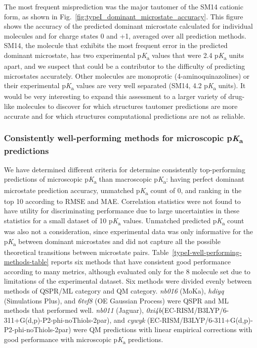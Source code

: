\documentclass[9pt,lineno,final]{elife}
\newcommand{\pKa}{p\textit{K}\textsubscript{a}}
\begin{document}
The most frequent misprediction was the major tautomer of the SM14 cationic form, as shown in Fig.~\ref{fig:typeI_dominant_microstate_accuracy}. 
This figure shows the accuracy of the predicted dominant microstate calculated for individual molecules and for charge states 0 and +1, averaged over all prediction methods. 
SM14, the molecule that exhibits the most frequent error in the predicted dominant microstate, has two experimental \pKa{} values that were 2.4 \pKa{} units apart, and we suspect that could be a contributor to the difficulty of predicting microstates accurately. 
Other molecules are monoprotic (4-aminoquinazolines) or their experimental \pKa{} values are very well separated (SM14, 4.2 \pKa{} units). 
It would be very interesting to expand this assessment to a larger variety of drug-like molecules to discover for which structures tautomer predictions are more accurate and for which structures computational predictions are not as reliable.


\subsubsection{Consistently well-performing methods for microscopic \pKa{} predictions}

We have determined different criteria for determine consistently top-performing predictions of microscopic \pKa{} than macroscopic \pKa{}: having perfect dominant microstate prediction accuracy, unmatched \pKa{} count of 0, and ranking in the top 10 according to RMSE and MAE. 
Correlation statistics were not found to have utility for discriminating performance due to large uncertainties in these statistics for a small dataset of 10 \pKa{} values. 
Unmatched predicted \pKa{} count was also not a consideration, since experimental data was only informative for the \pKa{} between dominant microstates and did not capture all the possible theoretical transitions between microstate pairs. 
Table~\ref{typeI-well-performing-methods-table} reports six methods that have consistent good performance according to many metrics, although evaluated only for the 8 molecule set due to limitations of the experimental dataset. 
Six methods were divided evenly between methods of QSPR/ML category and QM category. 
\textit{nb016} (MoKa), \textit{hdiyq} (Simulations Plus), and \textit{6tvf8} (OE Gaussian Process) were QSPR and ML methods that performed well. 
\textit{nb011} (Jaguar), \textit{0xi4b}(EC-RISM/B3LYP/6-311+G(d,p)-P2-phi-noThiols-2par), and \textit{cywyk} (EC-RISM/B3LYP/6-311+G(d,p)-P2-phi-noThiols-2par) were QM predictions with linear empirical corrections with good performance with microscopic \pKa{} predictions. 
\end{document}

